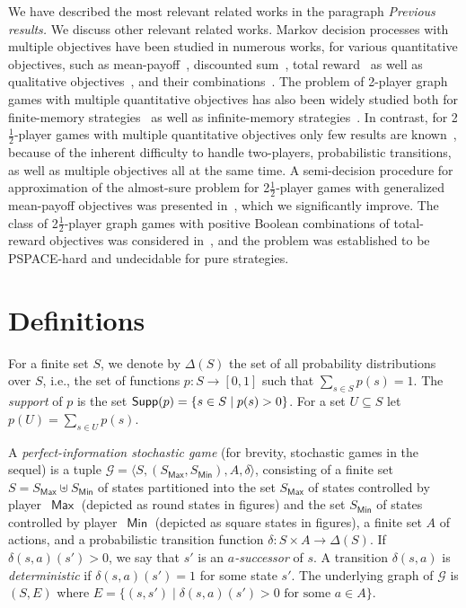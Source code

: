 \documentclass{article}
\newcommand{\tuple}[1]{\langle #1 \rangle}
\newcommand{\Supp}{{\sf Supp}}
\newcommand{\half}{$\frac{\text{1}}{\text{2}}$}
\newcommand{\DD}{\Delta}
\newcommand{\GG}{\mathcal{G}}
\newcommand{\PP}{\delta}
\DeclareMathOperator{\ma}{\mathsf{Max}}
\DeclareMathOperator{\mi}{\mathsf{Min}}
\begin{document}
\smallskip{} 
We have described the most relevant related works in the paragraph {\em Previous
results.} 
We discuss other relevant related works.
Markov decision processes with multiple objectives have been studied in numerous
works, for various quantitative objectives, such as mean-payoff~\cite{Cha07,BBCFK14}, 
discounted sum~\cite{CMH06,CFW13}, total reward~\cite{FKN11} as well as qualitative 
objectives~\cite{EKVY08}, and 
their combinations~\cite{CKK15,Baier-CSL-LICS-1,Baier-CSL-LICS-2,CR15}.
The problem of 2-player graph games with multiple quantitative objectives has 
also been widely studied both for finite-memory strategies~\cite{VCDHRR15,CRR14,JLS15,BR15,Vel14}
as well as infinite-memory strategies~\cite{VCDHRR15,CV13}.
In contrast, for 2\half-player games with multiple quantitative objectives only
few results are known~\cite{BKTW15,CFKSW13}, because of the inherent difficulty to handle two-players, probabilistic
transitions, as well as multiple objectives all at the same time.
A semi-decision procedure for approximation of the almost-sure problem for 2\half-player
games with generalized mean-payoff objectives was presented in~\cite{BKTW15}, 
which we significantly improve.
The class of 2\half-player graph games with positive Boolean combinations of total-reward
objectives was considered in~\cite{CFKSW13}, and the problem was established to be
PSPACE-hard and undecidable for pure strategies.










\section{Definitions}\label{sec:def}


For a finite set $S$, we denote by $\DD(S)$ the set of all probability 
distributions over $S$, i.e., the set of functions $p: S\to [0,1]$ 
such that $\sum_{s\in S} p(s) = 1$.
The \emph{support} of $p$ is the set $\Supp(p) = \{s \in S \mid p(s) > 0\}$.
For a set $U \subseteq S$ let $p(U) = \sum_{s \in U} p(s)$.

\smallskip{}
A \emph{perfect-information stochastic game} (for brevity, stochastic games
in the sequel) 
is a tuple $\GG = \tuple{S, (S_{\ma}, S_{\mi}), A, \PP}$, 
consisting of a finite set $S = S_{\ma} \uplus S_{\mi}$ of states
partitioned into the set $S_{\ma}$ of states controlled by player~$\ma$ (depicted
as round states in figures) and the set $S_{\mi}$ of states controlled by player~$\mi$ (depicted
as square states in figures), a finite set $A$ of actions, 
and a probabilistic transition function $\PP: S \times A \to \DD(S)$.
If $\PP(s,a)(s') > 0$, we say that $s'$ is an \emph{$a$-successor} of $s$.
A transition $\PP(s,a)$ is \emph{deterministic} if $\PP(s,a)(s') = 1$ for some 
state $s'$. 
The underlying graph of $\GG$ is $(S, E)$ where $E = \{(s,s') \mid 
\PP(s,a)(s') > 0 \text{ for some } a \in A \}$.
\end{document}
